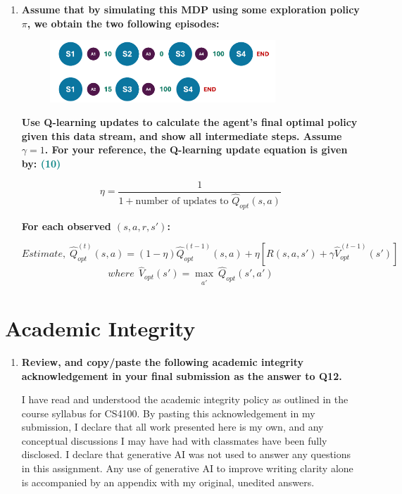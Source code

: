 \documentclass[a4paper]{article}
\begin{document}
\begin{sloppypar}
\begin{enumerate}[start=8,label=Q\arabic*,left=0pt]
    \item \textbf{Assume that by simulating this MDP using some exploration policy $\pi$, we obtain the
    two following episodes:}

    \begin{figure}[H]
        \centering  
        \includegraphics[width=0.8\textwidth]{Q11_mdp.png}
        \label{fig:Q11_mdp}
    \end{figure}

    \textbf{Use Q-learning updates to calculate the agent’s final optimal policy given this data stream,
    and show all intermediate steps. Assume $\gamma = 1$. For your reference, the Q-learning update equation is given by: \hfill \textcolor{teal}{(10)}}
    
    \[ \eta = \frac{1}{1 + \text{number of updates to } \hat{Q}_{opt}(s, a)} \]

    \textbf{For each observed $(s, a, r, s')$:}

    \[ Estimate, \; \hat{Q}^{(t)}_{opt}(s, a) = (1 - \eta) \hat{Q}^{(t-1)}_{opt}(s, a) + \eta[R(s, a, s') + \gamma \hat{V}^{(t-1)}_{opt}(s')] \]
    \[ where \:\: \hat{V}_{opt}(s') = \max_{\substack{a'}} \ \hat{Q}_{opt}(s', a') \]

\end{enumerate}

\section{Academic Integrity}

\begin{enumerate}[start=12,label=Q\arabic*,left=0pt]
    \item \textbf{Review, and copy/paste the following academic integrity acknowledgement in your final submission as the answer to Q12.}
    
    \par I have read and understood the academic integrity policy as outlined in the course syllabus for CS4100. 
    By pasting this acknowledgement in my submission, I declare that all work presented here is my own, and any conceptual 
    discussions I may have had with classmates have been fully disclosed. I declare that generative AI was not used to answer
    any questions in this assignment. Any use of generative AI to improve writing clarity alone is accompanied by an appendix 
    with my original, unedited answers.

\end{enumerate}

\end{sloppypar}



\end{document}
